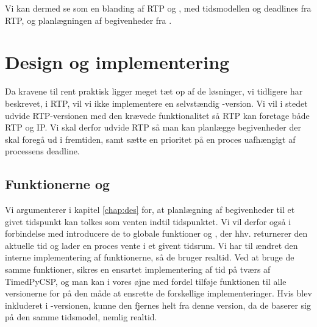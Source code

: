 Vi kan dermed se \is som en blanding af RTP og \des, med tidsmodellen og deadlines fra RTP, og planlægningen af begivenheder fra \des. 



\section{Design og implementering} 

Da kravene til \is rent praktisk ligger meget tæt op af de løsninger, vi tidligere har beskrevet, i RTP, vil vi ikke implementere en selvstændig \ip-version. Vi vil i stedet udvide RTP-versionen med den krævede funktionalitet så RTP kan foretage både RTP og IP.
Vi skal derfor udvide RTP så man kan planlægge begivenheder der skal foregå ud i fremtiden, samt sætte en prioritet på en proces uafhængigt af processens deadline. 


\subsection{Funktionerne  og }

Vi argumenterer i kapitel \ref{chap:des} for, at planlægning af begivenheder til et givet tidspunkt kan tolkes som venten indtil tidspunktet. Vi vil derfor også i forbindelse med \ip introducere de to globale funktioner  og , der hhv. returnerer den aktuelle tid og lader en proces vente i et givent tidsrum. Vi har til \is ændret den interne implementering af funktionerne, så de bruger realtid. Ved at bruge de samme funktioner, sikres en ensartet implementering af tid på tværs af TimedPyCSP, og man kan i vores øjne med fordel tilføje funktionen  til alle \pycsp versionerne for på den måde at ensrette de forskellige implementeringer. Hvis  blev inkluderet i -versionen, kunne den fjernes helt fra denne version, da de baserer sig på den samme tidsmodel, nemlig realtid.

